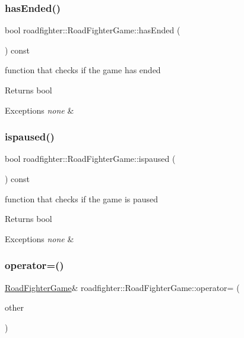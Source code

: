 \subsubsection{\texorpdfstring{has\+Ended()}{hasEnded()}}
{\footnotesize\ttfamily bool roadfighter\+::\+Road\+Fighter\+Game\+::has\+Ended (\begin{DoxyParamCaption}{ }\end{DoxyParamCaption}) const}

function that checks if the game has ended \begin{DoxyReturn}{Returns}
bool 
\end{DoxyReturn}

\begin{DoxyExceptions}{Exceptions}
{\em none} & \\
\hline
\end{DoxyExceptions}
\mbox{\label{classroadfighter_1_1RoadFighterGame_a2458b6d49a2bbbb974d9924d87cf0206}} 
\subsubsection{\texorpdfstring{ispaused()}{ispaused()}}
{\footnotesize\ttfamily bool roadfighter\+::\+Road\+Fighter\+Game\+::ispaused (\begin{DoxyParamCaption}{ }\end{DoxyParamCaption}) const}

function that checks if the game is paused \begin{DoxyReturn}{Returns}
bool 
\end{DoxyReturn}

\begin{DoxyExceptions}{Exceptions}
{\em none} & \\
\hline
\end{DoxyExceptions}
\mbox{\label{classroadfighter_1_1RoadFighterGame_a2bfbab81a2304aa6c1e27571720ec431}} 
\subsubsection{\texorpdfstring{operator=()}{operator=()}\hspace{0.1cm}{\footnotesize\ttfamily [1/2]}}
{\footnotesize\ttfamily \hyperlink{classroadfighter_1_1RoadFighterGame}{Road\+Fighter\+Game}\& roadfighter\+::\+Road\+Fighter\+Game\+::operator= (\begin{DoxyParamCaption}\item[{\hyperlink{classroadfighter_1_1RoadFighterGame}{Road\+Fighter\+Game} \&}]{other }\end{DoxyParamCaption})\hspace{0.3cm}{\ttfamily [default]}}

